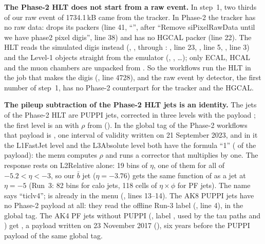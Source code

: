 \textbf{The Phase-2 HLT does not start from a raw event.} In step~1, two thirds of our raw event of 1734.1\,kB came from the
tracker. In Phase-2 the tracker has no raw data:  drops
its packers (line 41, ``'', after ``Remove siPixelRawData until we have phase2 pixel digis'', line 38)
and has no HGCAL packer (line 22). The HLT reads the simulated digis instead (,
,  through :
, line 23, , line 5, , line
3) and the Level-1 objects straight from the emulator (, , \ldots); only ECAL,
HCAL and the muon chambers are unpacked from . So the workflows run the HLT in the job that makes
the digis (, line 4728), and the raw event by detector, the first number of step~1, has no Phase-2
counterpart for the tracker and the HGCAL.

\textbf{The pileup subtraction of the Phase-2 HLT jets is an identity.} The jets of the Phase-2 HLT are PUPPI jets,
corrected in three levels with the payload ; the first level is an 
with $\rho$ from  (). In
the global tag of the Phase-2 workflows that payload is
, one interval of validity written
on 21 September 2023, and in it the L1FastJet level and the L3Absolute level both have the formula ``1'' ( of the payload): the menu computes $\rho$ and runs a corrector that multiplies by one. The response rests on
L2Relative alone: 19 bins of $\eta$, one of them for all of $-5.2<\eta<-3$, so our $\bar{b}$ jet ($\eta=-3.76$) gets the
same function of \pt{} as a jet at $\eta=-5$ (Run~3: 82 bins for calo jets, 118 cells of $\eta\times\phi$ for PF jets).
The name says ``ticlv4'';  is already in the menu (,
lines 13--14). The AK8 PUPPI jets have no Phase-2 payload at all: they read the offline Run-3 label 
(, line 4),  in the global tag. The
AK4 PF jets without PUPPI (, label , used by the tau paths and
) get , a payload written on 23 November 2017 (),
six years before the PUPPI payload of the same global tag.

